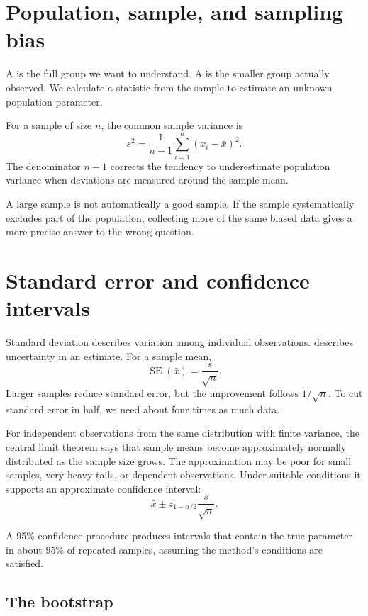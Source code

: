 \section{Population, sample, and sampling bias}

A  is the full group we want to understand. A  is the smaller group actually observed. We calculate a statistic from the sample to estimate an unknown population parameter.

For a sample of size $n$, the common sample variance is
\[
  s^2=\frac{1}{n-1}\sum_{i=1}^{n}(x_i-\bar{x})^2.
\]
The denominator $n-1$ corrects the tendency to underestimate population variance when deviations are measured around the sample mean.

\begin{pitfall}
A large sample is not automatically a good sample. If the sample systematically excludes part of the population, collecting more of the same biased data gives a more precise answer to the wrong question.
\end{pitfall}

\section{Standard error and confidence intervals}

Standard deviation describes variation among individual observations.  describes uncertainty in an estimate. For a sample mean,
\[
  \operatorname{SE}(\bar{x})=\frac{s}{\sqrt{n}}.
\]
Larger samples reduce standard error, but the improvement follows $1/\sqrt{n}$. To cut standard error in half, we need about four times as much data.

For independent observations from the same distribution with finite variance, the central limit theorem says that sample means become approximately normally distributed as the sample size grows. The approximation may be poor for small samples, very heavy tails, or dependent observations. Under suitable conditions it supports an approximate confidence interval:
\[
  \bar{x}\pm z_{1-\alpha/2}\frac{s}{\sqrt{n}}.
\]

A 95\% confidence procedure produces intervals that contain the true parameter in about 95\% of repeated samples, assuming the method's conditions are satisfied.

\subsection{The bootstrap}

